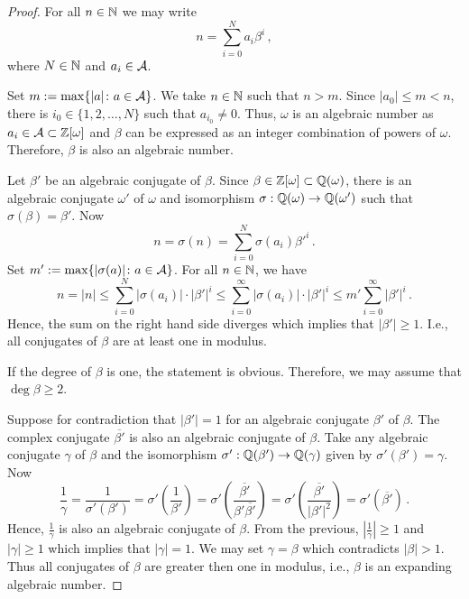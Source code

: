 \documentclass{article}
\begin{document}
\begin{proof}
For all $n\in\mathbb{N}$ we may write 
    $$
    n=\sum_{i=0}^{N}a_i\beta^i\,,
    $$
    where $N\in\mathbb{N}$ and $a_i\in\mathcal{A}$.
    
    Set $m:= \max\{|a|\colon a\in\mathcal{A}\}$. We take $n\in\mathbb{N}$ such that $n>m$. 
    Since $|a_0|\leq m<n$, there is $i_0 \in \{1,2,\dots,N\}$ such that $a_{i_0}\neq 0$. Thus, $\omega$ is an algebraic number as $a_i\in\mathcal{A}\subset\mathbb{Z}[\omega]$ and $\beta$ can be expressed as an integer combination of powers of $\omega$. Therefore, $\beta$ is also an algebraic number.
    
    Let $\beta'$ be an algebraic conjugate of $\beta$.  
    Since $\beta\in\mathbb{Z}[\omega]\subset\mathbb{Q}(\omega)$, there is an algebraic conjugate $\omega'$ of $\omega$ and isomorphism $\sigma: \mathbb{Q}(\omega)\rightarrow \mathbb{Q}(\omega')$ such that $\sigma(\beta)=\beta'$. Now 
    $$
    n=\sigma(n)=\sum_{i=0}^{N}\sigma(a_i)\beta'^i\,.
    $$
    Set $m':= \max\{|\sigma(a)|\colon a\in\mathcal{A}\}$.  For all $n\in\mathbb{N}$, we have 
    $$
    n=|n|\leq\sum_{i=0}^{N}|\sigma(a_i)|\cdot|\beta'|^i \leq \sum_{i=0}^{\infty}|\sigma(a_i)|\cdot|\beta'|^i \leq m'\sum_{i=0}^{\infty}|\beta'|^i\,.  
    $$
    Hence, the sum on the right hand side diverges which implies that $|\beta'|\geq 1$. I.e., all conjugates of $\beta$ are at least one in modulus.
    
    If the degree of $\beta$ is one, the statement is obvious.  Therefore, we may assume that $\deg \beta \geq 2$. 
    
    Suppose  for contradiction that $|\beta'|=1$ for an algebraic conjugate $\beta'$  of $\beta$. The complex conjugate $\overline{\beta'}$ is also an algebraic conjugate of $\beta$. Take any algebraic conjugate $\gamma$ of $\beta$ and the isomorphism $\sigma': \mathbb{Q}(\beta')\rightarrow \mathbb{Q}(\gamma)$ given by $\sigma'(\beta')=\gamma$.
    Now
    $$
    \frac{1}{\gamma}=\frac{1}{\sigma'(\beta')}=\sigma'\left(\frac{1}{\beta'}\right)=\sigma'\left(\frac{\overline{\beta'}}{\beta'\overline{\beta'}}\right)=\sigma'\left(\frac{\overline{\beta'}}{|\beta'|^2}\right)=\sigma'(\overline{\beta'})\,.
    $$
    Hence, $\frac{1}{\gamma}$ is also an algebraic conjugate of $\beta$. From the previous, $\left|\frac{1}{\gamma}\right|\geq 1$ and $|\gamma|\geq 1$ which implies that $|\gamma|=1$. We may set $\gamma=\beta$ which contradicts $|\beta|>1$. Thus all conjugates of $\beta$ are greater then one in modulus, i.e., $\beta$ is an expanding algebraic number.
\end{proof}
\end{document}
